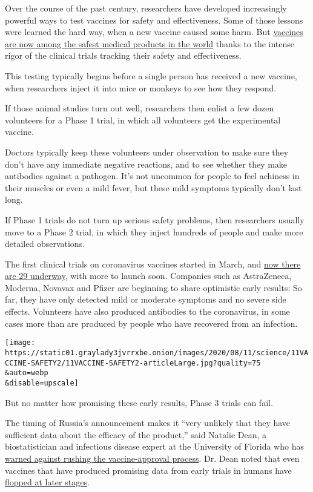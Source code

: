 Over the course of the past century, researchers have developed
increasingly powerful ways to test vaccines for safety and
effectiveness. Some of those lessons were learned the hard way, when a
new vaccine caused some harm. But
\href{https://www.nytimes3xbfgragh.onion/2019/06/18/health/you-should-get-vaccinated.html}{vaccines
are now among the safest medical products in the world} thanks to the
intense rigor of the clinical trials tracking their safety and
effectiveness.

This testing typically begins before a single person has received a new
vaccine, when researchers inject it into mice or monkeys to see how they
respond.

If those animal studies turn out well, researchers then enlist a few
dozen volunteers for a Phase 1 trial, in which all volunteers get the
experimental vaccine.

Doctors typically keep these volunteers under observation to make sure
they don't have any immediate negative reactions, and to see whether
they make antibodies against a pathogen. It's not uncommon for people to
feel achiness in their muscles or even a mild fever, but these mild
symptoms typically don't last long.

If Phase 1 trials do not turn up serious safety problems, then
researchers usually move to a Phase 2 trial, in which they inject
hundreds of people and make more detailed observations.

The first clinical trials on coronavirus vaccines started in March, and
\href{https://www.nytimes3xbfgragh.onion/interactive/2020/science/coronavirus-vaccine-tracker.html}{now
there are 29 underway}, with more to launch soon. Companies such as
AstraZeneca, Moderna, Novavax and Pfizer are beginning to share
optimistic early results: So far, they have only detected mild or
moderate symptoms and no severe side effects. Volunteers have also
produced antibodies to the coronavirus, in some cases more than are
produced by people who have recovered from an infection.

\texttt{[image: https://static01.graylady3jvrrxbe.onion/images/2020/08/11/science/11VACCINE-SAFETY2/11VACCINE-SAFETY2-articleLarge.jpg?quality=75\\\&auto=webp\\\&disable=upscale]}

But no matter how promising these early results, Phase 3 trials can
fail.

The timing of Russia's announcement makes it ``very unlikely that they
have sufficient data about the efficacy of the product,'' said Natalie
Dean, a biostatistician and infectious disease expert at the University
of Florida who has
\href{https://www.nytimes3xbfgragh.onion/2020/08/03/opinion/sunday/coronavirus-vaccine-efficacy-trials.html}{warned
against rushing the vaccine-approval process}. Dr. Dean noted that even
vaccines that have produced promising data from early trials in humans
have \href{https://www.fda.gov/media/102332/download}{flopped at later
stages}.

